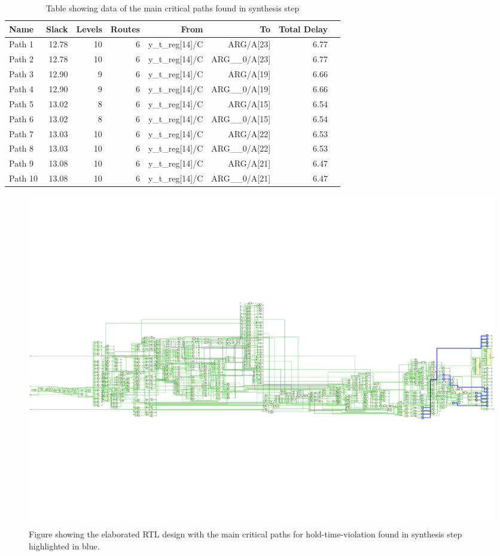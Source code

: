 \begin{table}[H]
    \centering
    \small
    \captionsetup{skip=10pt} 
    \begin{tabular}{lrrrrrrr}
        \hline
        Name &  Slack &  Levels &  Routes & From      & To                 & Total Delay    \\
        \hline
        Path 1 &  12.78 &      10 &       6 & y\_t\_reg[14]/C  & ARG/A[23]       &         6.77   \\
        Path 2 &  12.78 &      10 &       6 & y\_t\_reg[14]/C  & ARG\_\_0/A[23]  &         6.77   \\
        Path 3 &  12.90 &       9 &       6 & y\_t\_reg[14]/C  & ARG/A[19]       &         6.66   \\
        Path 4 &  12.90 &       9 &       6 & y\_t\_reg[14]/C  & ARG\_\_0/A[19]  &         6.66   \\
        Path 5 &  13.02 &       8 &       6 & y\_t\_reg[14]/C  & ARG/A[15]       &         6.54   \\
        Path 6 &  13.02 &       8 &       6 & y\_t\_reg[14]/C  & ARG\_\_0/A[15]  &         6.54   \\
        Path 7 &  13.03 &      10 &       6 & y\_t\_reg[14]/C  & ARG/A[22]       &         6.53   \\
        Path 8 &  13.03 &      10 &       6 & y\_t\_reg[14]/C  & ARG\_\_0/A[22]  &         6.53   \\
        Path 9 &  13.08 &      10 &       6 & y\_t\_reg[14]/C  & ARG/A[21]       &         6.47   \\
        Path 10 &  13.08 &      10 &       6 & y\_t\_reg[14]/C  & ARG\_\_0/A[21]  &         6.47   \\
        \hline
    \end{tabular}
    \caption{Table showing data of the main critical paths found in synthesis step}
    \label{tab:setup_synthesis}
\end{table}
    
\begin{figure}[H]
    \centering
    \includegraphics[width=\textwidth, trim=0 160 0 160, clip]{./images/Vivado/hold_synthesis.pdf}
    \caption{Figure showing the elaborated RTL design with the main critical paths for hold-time-violation found in synthesis step highlighted in blue.}
    \label{fig:hold_synthesis}
\end{figure}  

